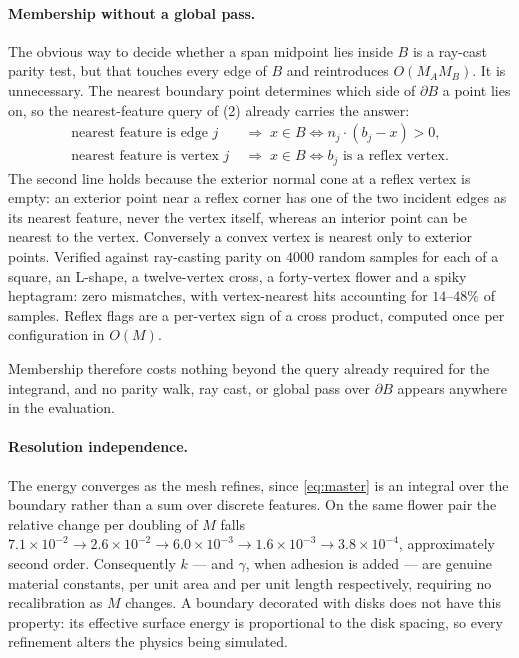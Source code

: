 \documentclass[11pt]{article}
\begin{document}
\paragraph{Membership without a global pass.} The obvious way to decide whether a span midpoint lies inside $B$ is a ray-cast parity test, but that touches every edge of $B$ and reintroduces $O(M_AM_B)$. It is unnecessary. The nearest boundary point determines which side of $\partial B$ a point lies on, so the nearest-feature query of (2) already carries the answer:
\begin{equation}
\boxed{\;
\begin{aligned}
\text{nearest feature is edge } j &\;\Longrightarrow\; x\in B \iff n_j\cdot(b_j-x) > 0,\\
\text{nearest feature is vertex } j &\;\Longrightarrow\; x\in B \iff b_j \text{ is a reflex vertex.}
\end{aligned}\;}
\label{eq:membership}
\end{equation}
The second line holds because the exterior normal cone at a reflex vertex is empty: an exterior point near a reflex corner has one of the two incident edges as its nearest feature, never the vertex itself, whereas an interior point can be nearest to the vertex. Conversely a convex vertex is nearest only to exterior points. Verified against ray-casting parity on $4000$ random samples for each of a square, an L-shape, a twelve-vertex cross, a forty-vertex flower and a spiky heptagram: zero mismatches, with vertex-nearest hits accounting for $14$--$48\%$ of samples. Reflex flags are a per-vertex sign of a cross product, computed once per configuration in $O(M)$.

Membership therefore costs nothing beyond the query already required for the integrand, and no parity walk, ray cast, or global pass over $\partial B$ appears anywhere in the evaluation.

\paragraph{Resolution independence.} The energy converges as the mesh refines, since \eqref{eq:master} is an integral over the boundary rather than a sum over discrete features. On the same flower pair the relative change per doubling of $M$ falls $7.1\times10^{-2}\to2.6\times10^{-2}\to6.0\times10^{-3}\to1.6\times10^{-3}\to3.8\times10^{-4}$, approximately second order. Consequently $k$ --- and $\gamma$, when adhesion is added --- are genuine material constants, per unit area and per unit length respectively, requiring no recalibration as $M$ changes. A boundary decorated with disks does not have this property: its effective surface energy is proportional to the disk spacing, so every refinement alters the physics being simulated.
\end{document}
